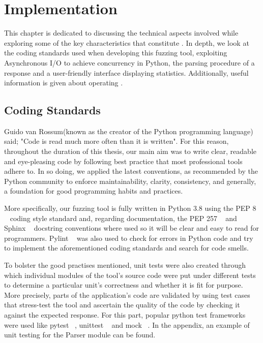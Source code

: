 \chapter{Implementation}
\label{sec:implementation}
\minitoc
\vspace*{1cm}

This chapter is dedicated to discussing the technical aspects involved while exploring some of
the key characteristics that constitute \pname{}. In depth, we look at the coding standards used when developing this fuzzing tool, exploiting Asynchronous I/O to achieve concurrency in Python, the parsing procedure of a response and a user-friendly interface displaying statistics. Additionally, useful information is given about operating \pname{}.


\section{Coding Standards}
Guido van Rossum(known as the creator of the Python programming language) said; "Code is read much more often than it is written". For this reason, throughout the duration of this thesis, our main aim was to write clear, readable and eye-pleasing code by following best practice that most professional tools adhere to. In so doing, we applied the latest conventions, as recommended by the Python community to enforce maintainability, clarity, consistency, and generally, a foundation for good programming habits and practices. 

More specifically, our fuzzing tool is fully written in Python 3.8 using the PEP 8 ~\cite{python_pep8} coding style standard and, regarding documentation, the PEP 257 ~\cite{python_pep257} and Sphinx ~\cite{sphinx} docstring conventions where used so it will be clear and easy to read for programmers. Pylint ~\cite{pylint_module} was also used to check for errors in Python code and try to implement the aforementioned coding standards and search for code smells.

To bolster the good practises mentioned, unit tests were also created through which individual modules of the tool's source code were put under different tests to determine a particular unit's correctness and whether it is fit for purpose. More precisely, parts of the application's code are validated by using test cases that stress-test the tool and ascertain the quality of the code by checking it against the expected response. For this part, popular python test frameworks were used like pytest ~\cite{pytest_module}, unittest ~\cite{unittest_module} and mock ~\cite{mock}. In the appendix, an example of unit testing for the Parser module can be found.

